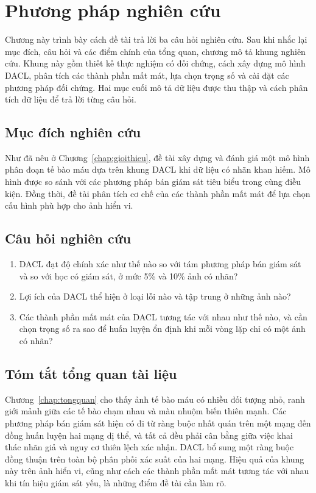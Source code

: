 \chapter{Phương pháp nghiên cứu}
\label{chap:phuongphap}

Chương này trình bày cách đề tài trả lời ba câu hỏi nghiên cứu. Sau khi nhắc lại mục đích, câu hỏi và các điểm chính của tổng quan, chương mô tả khung nghiên cứu. Khung này gồm thiết kế thực nghiệm có đối chứng, cách xây dựng mô hình DACL, phân tích các thành phần mất mát, lựa chọn trọng số và cài đặt các phương pháp đối chứng. Hai mục cuối mô tả dữ liệu được thu thập và cách phân tích dữ liệu để trả lời từng câu hỏi.

\section{Mục đích nghiên cứu}

Như đã nêu ở Chương~\ref{chap:gioithieu}, đề tài xây dựng và đánh giá một mô hình phân đoạn tế bào máu dựa trên khung DACL khi dữ liệu có nhãn khan hiếm. Mô hình được so sánh với các phương pháp bán giám sát tiêu biểu trong cùng điều kiện. Đồng thời, đề tài phân tích cơ chế của các thành phần mất mát để lựa chọn cấu hình phù hợp cho ảnh hiển vi.

\section{Câu hỏi nghiên cứu}

\begin{enumerate}[label=\textbf{CH\arabic*.},leftmargin=1.6cm]
  \item DACL đạt độ chính xác như thế nào so với tám phương pháp bán giám sát và so với học có giám sát, ở mức 5\% và 10\% ảnh có nhãn?
  \item Lợi ích của DACL thể hiện ở loại lỗi nào và tập trung ở những ảnh nào?
  \item Các thành phần mất mát của DACL tương tác với nhau như thế nào, và cần chọn trọng số ra sao để huấn luyện ổn định khi mỗi vòng lặp chỉ có một ảnh có nhãn?
\end{enumerate}

\section{Tóm tắt tổng quan tài liệu}

Chương~\ref{chap:tongquan} cho thấy ảnh tế bào máu có nhiều đối tượng nhỏ, ranh giới mảnh giữa các tế bào chạm nhau và màu nhuộm biến thiên mạnh. Các phương pháp bán giám sát hiện có đi từ ràng buộc nhất quán trên một mạng đến đồng huấn luyện hai mạng dị thể, và tất cả đều phải cân bằng giữa việc khai thác nhãn giả và nguy cơ thiên lệch xác nhận. DACL bổ sung một ràng buộc đồng thuận trên toàn bộ phân phối xác suất của hai mạng. Hiệu quả của khung này trên ảnh hiển vi, cũng như cách các thành phần mất mát tương tác với nhau khi tín hiệu giám sát yếu, là những điểm đề tài cần làm rõ.

